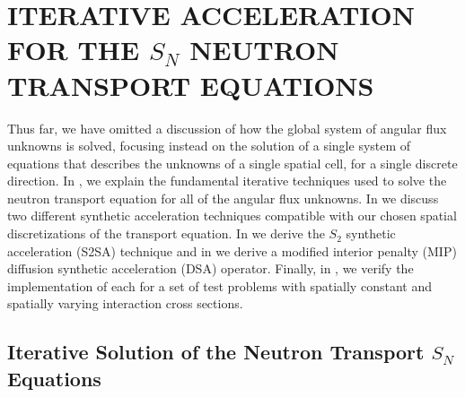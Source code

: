 %
%
%



\chapter{\uppercase{Iterative Acceleration for the $S_N$ Neutron Transport Equations}}
\label{sec:chapter4_acceleration}

Thus far, we have omitted a discussion of how the global system of angular flux unknowns is solved, 
focusing instead on the solution of a single system of equations that describes the unknowns of a single spatial cell, for a single discrete direction.
In , we explain the fundamental iterative techniques used to solve the neutron transport equation for all of the angular flux unknowns.
In  we discuss two different synthetic acceleration techniques compatible with our chosen spatial discretizations of the transport equation.
In  we derive the $S_2$ synthetic acceleration (S2SA) technique \cite{s2sa} and in  we derive a modified interior penalty (MIP) diffusion synthetic acceleration \cite{mip_dsa} (DSA) operator.  Finally, in , we verify the implementation of each for a set of test problems with spatially constant and spatially varying interaction cross sections.


\section{Iterative Solution of the Neutron Transport $S_N$ Equations}
\label{sec:dsa_basis}

